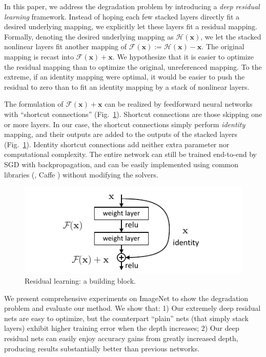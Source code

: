 \documentclass[10pt,twocolumn,letterpaper]{article}
\newcommand{\ve}[1]{\mathbf{#1}} %
\begin{document}
In this paper, we address the degradation problem by introducing a \emph{deep residual learning} framework.
Instead of hoping each few stacked layers directly fit a desired underlying mapping, we explicitly let these layers fit a residual mapping. Formally, denoting the desired underlying mapping as $\mathcal{H}(\ve{x})$, we let the stacked nonlinear layers fit another mapping of $\mathcal{F}(\ve{x}):=\mathcal{H}(\ve{x})-\ve{x}$. The original mapping is recast into $\mathcal{F}(\ve{x})+\ve{x}$.
We hypothesize that it is easier to optimize the residual mapping than to optimize the original, unreferenced mapping. To the extreme, if an identity mapping were optimal, it would be easier to push the residual to zero than to fit an identity mapping by a stack of nonlinear layers.

The formulation of $\mathcal{F}(\ve{x})+\ve{x}$ can be realized by feedforward neural networks with ``shortcut connections'' (Fig.~\ref{fig:block}). Shortcut connections \cite{Bishop1995,Ripley1996,Venables1999} are those skipping one or more layers. In our case, the shortcut connections simply perform \emph{identity} mapping, and their outputs are added to the outputs of the stacked layers (Fig.~\ref{fig:block}). Identity shortcut connections add neither extra parameter nor computational complexity. The entire network can still be trained end-to-end by SGD with backpropagation, and can be easily implemented using common libraries (\eg, Caffe \cite{Jia2014}) without modifying the solvers.

\begin{figure}[t]
  \centering
  \hspace{48pt}
  \includegraphics[width=0.9\linewidth]{eps/block}
  \vspace{-.5em}
  \caption{Residual learning: a building block.}
  \label{fig:block}
  \vspace{-1em}
\end{figure}

We present comprehensive experiments on ImageNet \cite{Russakovsky2014} to show the degradation problem and evaluate our method.
We show that: 1) Our extremely deep residual nets are easy to optimize, but the counterpart ``plain'' nets (that simply stack layers) exhibit higher training error when the depth increases; 2) Our deep residual nets can easily enjoy accuracy gains from greatly increased depth, producing results substantially better than previous networks.
\end{document}
